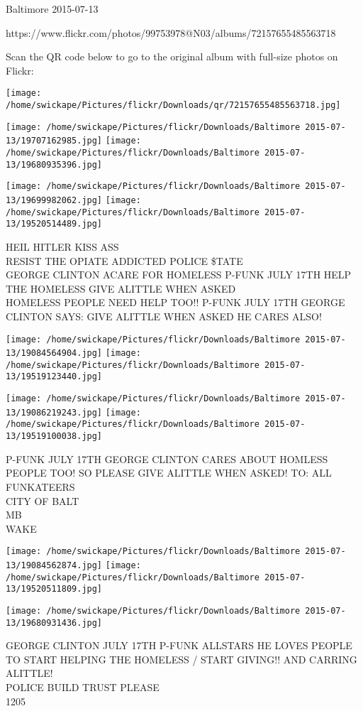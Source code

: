 \documentclass[10pt,letterpaper]{article}
\begin{document}
Baltimore 2015-07-13

https://www.flickr.com/photos/99753978@N03/albums/72157655485563718

Scan the QR code below to go to the original album with full-size photos on Flickr:

\texttt{[image: /home/swickape/Pictures/flickr/Downloads/qr/72157655485563718.jpg]}
\pagebreak

\texttt{[image: /home/swickape/Pictures/flickr/Downloads/Baltimore 2015-07-13/19707162985.jpg]}
\texttt{[image: /home/swickape/Pictures/flickr/Downloads/Baltimore 2015-07-13/19680935396.jpg]}

\texttt{[image: /home/swickape/Pictures/flickr/Downloads/Baltimore 2015-07-13/19699982062.jpg]}
\texttt{[image: /home/swickape/Pictures/flickr/Downloads/Baltimore 2015-07-13/19520514489.jpg]}

HEIL HITLER KISS ASS\\
RESIST THE OPIATE ADDICTED POLICE \$TATE\\
GEORGE CLINTON ACARE FOR HOMELESS P{-}FUNK JULY 17TH HELP THE HOMELESS GIVE ALITTLE WHEN ASKED\\
HOMELESS PEOPLE NEED HELP TOO!! P{-}FUNK JULY 17TH GEORGE CLINTON SAYS: GIVE ALITTLE WHEN ASKED HE CARES ALSO!\\
\pagebreak

\texttt{[image: /home/swickape/Pictures/flickr/Downloads/Baltimore 2015-07-13/19084564904.jpg]}
\texttt{[image: /home/swickape/Pictures/flickr/Downloads/Baltimore 2015-07-13/19519123440.jpg]}

\texttt{[image: /home/swickape/Pictures/flickr/Downloads/Baltimore 2015-07-13/19086219243.jpg]}
\texttt{[image: /home/swickape/Pictures/flickr/Downloads/Baltimore 2015-07-13/19519100038.jpg]}

P{-}FUNK JULY 17TH GEORGE CLINTON CARES ABOUT HOMLESS PEOPLE TOO!  SO PLEASE GIVE ALITTLE WHEN ASKED!  TO: ALL FUNKATEERS\\
CITY OF BALT\\
MB\\
WAKE\\
\pagebreak

\texttt{[image: /home/swickape/Pictures/flickr/Downloads/Baltimore 2015-07-13/19084562874.jpg]}
\texttt{[image: /home/swickape/Pictures/flickr/Downloads/Baltimore 2015-07-13/19520511809.jpg]}

\texttt{[image: /home/swickape/Pictures/flickr/Downloads/Baltimore 2015-07-13/19680931436.jpg]}

GEORGE CLINTON JULY 17TH P{-}FUNK ALLSTARS HE LOVES PEOPLE TO START HELPING THE HOMELESS / START GIVING!! AND CARRING ALITTLE!\\
POLICE BUILD TRUST PLEASE\\
1205\\
\pagebreak
\end{document}

